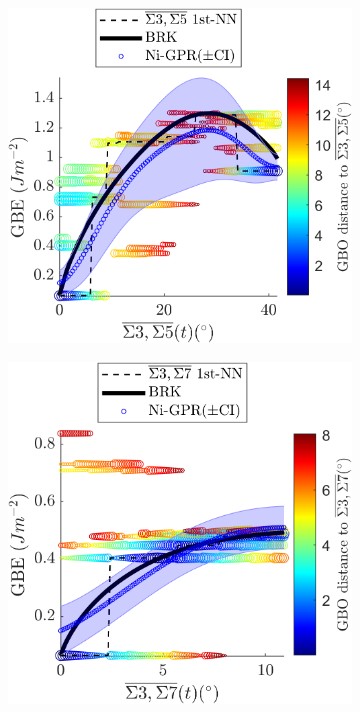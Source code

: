 \documentclass[final,twocolumn,12pt]{elsarticle}
\begin{document}
	\begin{figure}[!htb]
		\centering
		\begin{subfigure}[b]{0.4\textwidth}
			\includegraphics[width=\textwidth]{figures/tunnel-3-5-olmsted.png}
			\caption{}
			\label{fig:tunnel-3-5-olmsted}
		\end{subfigure}
		\begin{subfigure}[b]{0.4\textwidth}
			\includegraphics[width=\textwidth]{figures/tunnel-3-7-olmsted.png}
			\caption{}
			\label{fig:tunnel-3-7-olmsted}
		\end{subfigure}
		

\end{figure}
\end{document}
